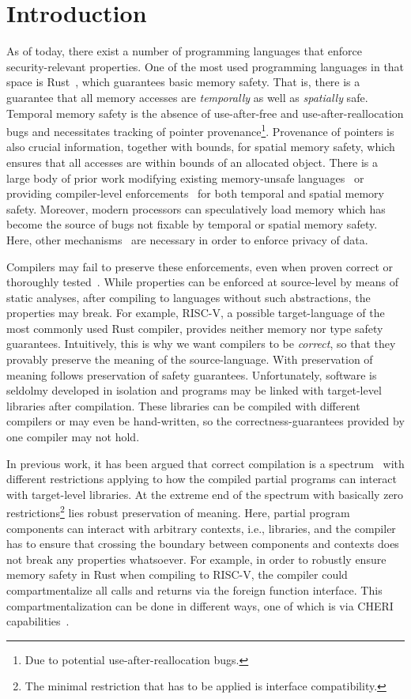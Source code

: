 

\section{Introduction}\label{sec:introduction}

As of today, there exist a number of programming languages that enforce security-relevant properties.
One of the most used programming languages in that space is Rust~\cite{}, which guarantees basic memory safety.
That is, there is a guarantee that all memory accesses are {\em temporally} as well as {\em spatially} safe. 
Temporal memory safety is the absence of use-after-free and use-after-reallocation bugs and necessitates tracking of pointer provenance\footnote{Due to potential use-after-reallocation bugs.}. %
Provenance of pointers is also crucial information, together with bounds, for spatial memory safety, which ensures that all accesses are within bounds of an allocated object.
There is a large body of prior work modifying existing memory-unsafe languages~\cite{} or providing compiler-level enforcements~\cite{} for both temporal and spatial memory safety.
Moreover, modern processors can speculatively load memory which has become the source of bugs not fixable by temporal or spatial memory safety.
Here, other mechanisms~\cite{} are necessary in order to enforce privacy of data.

Compilers may fail to preserve these enforcements, even when proven correct or thoroughly tested~\cite{}.
While properties can be enforced at source-level by means of static analyses, after compiling to languages without such abstractions, the properties may break.
For example, RISC-V, a possible target-language of the most commonly used Rust compiler,  provides neither memory nor type safety guarantees.
Intuitively, this is why we want compilers to be {\em correct}, so that they provably preserve the meaning of the source-language.
With preservation of meaning follows preservation of safety guarantees.
Unfortunately, software is seldolmy developed in isolation and programs may be linked with target-level libraries after compilation.
These libraries can be compiled with different compilers or may even be hand-written, so the correctness-guarantees provided by one compiler may not hold.

In previous work, it has been argued that correct compilation is a spectrum~\cite{} with different restrictions applying to how the compiled partial programs can interact with target-level libraries.
At the extreme end of the spectrum with basically zero restrictions\footnote{The minimal restriction that has to be applied is interface compatibility.} lies robust preservation of meaning.
Here, partial program components can interact with arbitrary contexts, i.e., libraries, and the compiler has to ensure that crossing the boundary between components and contexts does not break any properties whatsoever.
For example, in order to robustly ensure memory safety in Rust when compiling to RISC-V, the compiler could compartmentalize all calls and returns via the foreign function interface.
This compartmentalization can be done in different ways, one of which is via CHERI capabilities~\cite{}.


